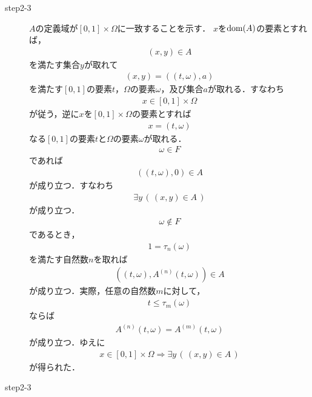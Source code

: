 \begin{sketch}
\begin{description}
			\item[step2-3]
				$A$の定義域が$[0,1] \times \Omega$に一致することを示す．
				$x$を$\operatorname*{dom} (A)$の要素とすれば，
				\begin{align}
					(x,y) \in A
				\end{align}
				を満たす集合$y$が取れて
				\begin{align}
					(x,y) = ((t,\omega),a)
				\end{align}
				を満たす$[0,1]$の要素$t$，$\Omega$の要素$\omega$，及び集合$a$が取れる．すなわち
				\begin{align}
					x \in [0,1] \times \Omega
				\end{align}
				が従う，逆に$x$を$[0,1] \times \Omega$の要素とすれば
				\begin{align}
					x = (t,\omega)
				\end{align}
				なる$[0,1]$の要素$t$と$\Omega$の要素$\omega$が取れる．
				\begin{align}
					\omega \in F
				\end{align}
				であれば
				\begin{align}
					((t,\omega),0) \in A
				\end{align}
				が成り立つ．すなわち
				\begin{align}
					\exists y\, \left(\, (x,y) \in A\, \right)
				\end{align}
				が成り立つ．
				\begin{align}
					\omega \notin F
				\end{align}
				であるとき，
				\begin{align}
					1 = \tau_{n}(\omega)
				\end{align}
				を満たす自然数$n$を取れば
				\begin{align}
					\left((t,\omega),A^{(n)}(t,\omega)\right) \in A
				\end{align}
				が成り立つ．実際，任意の自然数$m$に対して，
				\begin{align}
					t \leq \tau_{m}(\omega)
				\end{align}
				ならば
				\begin{align}
					A^{(n)}(t,\omega) = A^{(m)}(t,\omega)
				\end{align}
				が成り立つ．ゆえに
				\begin{align}
					x \in [0,1] \times \Omega \Longrightarrow 
					\exists y\, \left(\, (x,y) \in A\, \right)
				\end{align}
				が得られた．
				
			\item[step2-3]
				
				\QED
		\end{description}
	\end{sketch}
	